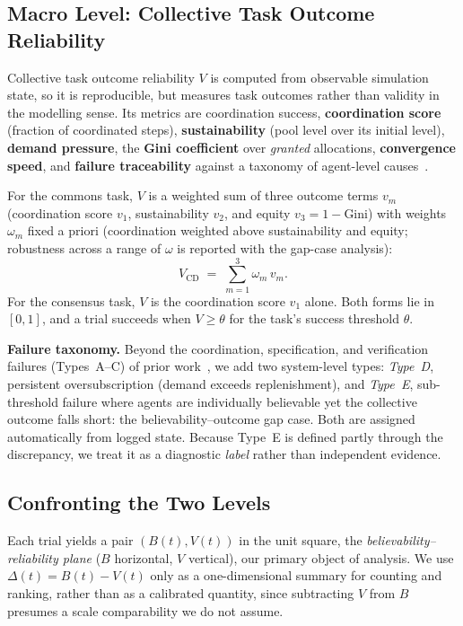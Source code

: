 \documentclass[runningheads]{llncs}
\begin{document}
\subsection{Macro Level: Collective Task Outcome Reliability}\label{sec:macro}
Collective task outcome reliability $V$ is computed from observable simulation state, so it is
reproducible, but measures task outcomes rather than validity in the modelling sense. Its metrics are
coordination success, \textbf{coordination score} (fraction of coordinated steps),
\textbf{sustainability} (pool level over its initial level), \textbf{demand pressure}, the
\textbf{Gini coefficient} over \emph{granted} allocations, \textbf{convergence speed}, and
\textbf{failure traceability} against a taxonomy of agent-level causes~\cite{cemri2025fails}.

For the commons task, $V$ is a weighted sum of three outcome terms $v_m$ (coordination score
$v_1$, sustainability $v_2$, and equity $v_3 = 1 - \text{Gini}$) with weights $\omega_m$ fixed a
priori (coordination weighted above sustainability and equity; robustness across a range of
$\omega$ is reported with the gap-case analysis):
\begin{equation}\label{eq:vscore}
V_{\mathrm{CD}} \;=\; \sum_{m=1}^{3} \omega_m\, v_m .
\end{equation}
For the consensus task, $V$ is the coordination score $v_1$ alone. Both forms lie in $[0,1]$, and a
trial succeeds when $V \geq \theta$ for the task's success threshold $\theta$.

\textbf{Failure taxonomy.} Beyond the coordination, specification, and verification failures
(Types~A--C) of prior work~\cite{cemri2025fails}, we add two system-level types: \emph{Type~D},
persistent oversubscription (demand exceeds replenishment), and \emph{Type~E}, sub-threshold
failure where agents are individually believable yet the collective outcome falls short: the
believability--outcome gap case. Both are assigned automatically from logged state. Because
Type~E is defined partly through the discrepancy, we treat it as a diagnostic \emph{label} rather
than independent evidence.


\subsection{Confronting the Two Levels}\label{sec:confront}
Each trial yields a pair $(B(t),V(t))$ in the unit square, the \emph{believability--reliability
plane} ($B$ horizontal, $V$ vertical), our primary object of analysis. We use $\Delta(t)=B(t)-V(t)$
only as a one-dimensional summary for counting and ranking, rather than as a calibrated quantity,
since subtracting $V$ from $B$ presumes a scale comparability we do not assume.
\end{document}
